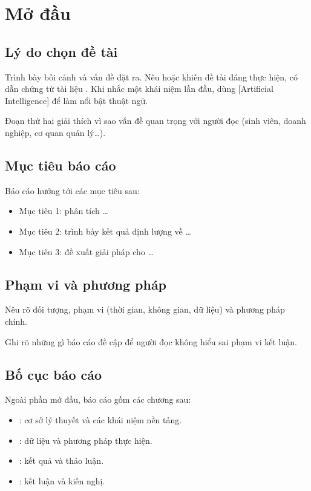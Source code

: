 \chapter{Mở đầu}
\label{chap:mo-dau}

\section{Lý do chọn đề tài}
\label{sec:ly-do}

Trình bày bối cảnh và vấn đề đặt ra. Nêu  hoặc
 khiến đề tài đáng thực hiện, có dẫn chứng từ tài liệu
\cite{acemoglu2022, brynjolfsson2025}. Khi nhắc một khái niệm lần đầu, dùng
[Artificial Intelligence] để làm nổi bật thuật ngữ.

Đoạn thứ hai giải thích vì sao vấn đề quan trọng với người đọc (sinh viên, doanh
nghiệp, cơ quan quản lý\dots).

\section{Mục tiêu báo cáo}
\label{sec:muc-tieu}

Báo cáo hướng tới các mục tiêu sau:
\begin{itemize}
  \item Mục tiêu 1: phân tích \dots
  \item Mục tiêu 2: trình bày kết quả định lượng về \dots
  \item Mục tiêu 3: đề xuất giải pháp cho \dots
\end{itemize}

\section{Phạm vi và phương pháp}
\label{sec:pham-vi}

Nêu rõ đối tượng, phạm vi (thời gian, không gian, dữ liệu) và phương pháp chính.

\begin{luuy}
  Ghi rõ những gì báo cáo  đề cập để người đọc không hiểu sai
  phạm vi kết luận.
\end{luuy}

\section{Bố cục báo cáo}
\label{sec:bo-cuc}

Ngoài phần mở đầu, báo cáo gồm các chương sau:
\begin{itemize}
  \item {}: cơ sở lý thuyết và các khái niệm nền tảng.
  \item {}: dữ liệu và phương pháp thực hiện.
  \item {}: kết quả và thảo luận.
  \item {}: kết luận và kiến nghị.
\end{itemize}

